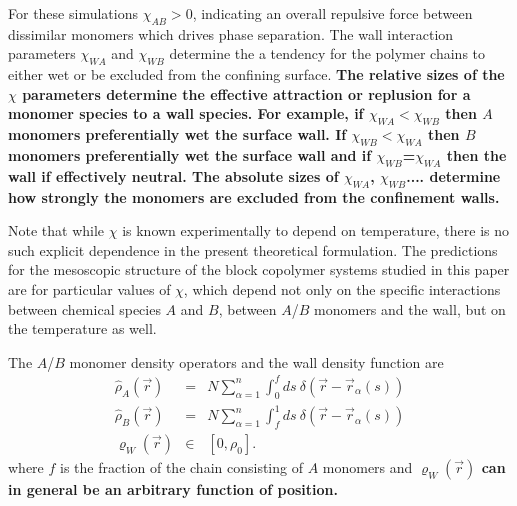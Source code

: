 \documentclass[onecolumn,amsmath,amssymb,floatfix]{elsart}
\begin{document}
For these simulations $\chi_{AB} > 0$, indicating an overall repulsive force between
dissimilar monomers which drives phase separation.
The wall interaction parameters $\chi_{WA}$ and $\chi_{WB}$ determine the 
a tendency for the polymer chains to either wet or be excluded from the confining surface.
{\bf 
The relative sizes of the $\chi$ parameters determine the effective attraction
or replusion for a monomer species to a wall species.
For example, if $\chi_{WA} < \chi_{WB}$ then $A$ monomers preferentially wet the
surface wall. If $\chi_{WB} < \chi_{WA}$ then $B$ monomers preferentially wet the
surface wall and if $\chi_{WB}$=$\chi_{WA}$ then the wall if effectively neutral.
The absolute sizes of $\chi_{WA}$, $\chi_{WB}$.... determine how strongly the monomers
are excluded from the confinement walls.
}

Note that while
$\chi$ is known experimentally to depend on temperature, there is
no such explicit dependence in the present theoretical
formulation.
The predictions for the mesoscopic structure of the
block copolymer systems studied in this paper are for particular values of
$\chi$, which depend not only on the specific interactions between
chemical species $A$ and $B$, between $A$/$B$ monomers and the wall,
but on the temperature as well.

The $A$/$B$ monomer density operators and the wall density function are
%
 \begin{eqnarray}
 {\hat \rho_A}({\vec r})
     & = & N \sum^{n}_{\alpha = 1}
           \int_0^f ds \ \delta({\vec r} - {\vec r}_{\alpha}(s)) \\
 {\hat \rho_B}({\vec r})
     & = & N \sum^{n}_{\alpha = 1}
           \int_f^1 ds \ \delta({\vec r} - {\vec r}_{\alpha}(s)) \\
 \varrho_W ({\vec r})
     & \in &  [0,\rho_0] .
 \end{eqnarray}
%
where $f$ is the fraction of the chain consisting of $A$ monomers
and
{\bf
$\varrho_W ({\vec r})$ can
in general be an arbitrary function of position.
}
\end{document}
